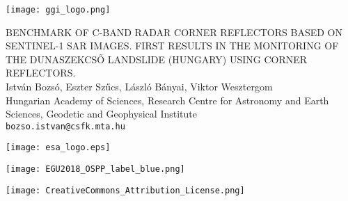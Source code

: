 \documentclass[a0, 18pt, landscape]{a0poster}
\begin{document}

\bfseries

\begin{mdframed}[linecolor=black, linewidth=5pt, innerleftmargin=10pt, innerrightmargin=10pt, innertopmargin=25pt, innerbottommargin=25pt, backgroundcolor=red!12.5!white, roundcorner=10pt]
    \hspace{25pt}
    \begin{minipage}[c]{0.1\textwidth}
        \texttt{[image: ggi\_logo.png]}
    \end{minipage}
    \hspace{-50pt}
    \begin{minipage}[c]{0.7\textwidth}
      \centering \LARGE {\color{blue!40!black} BENCHMARK OF C-BAND RADAR CORNER REFLECTORS BASED ON SENTINEL-1 SAR IMAGES. FIRST RESULTS IN THE MONITORING OF THE DUNASZEKCSŐ LANDSLIDE (HUNGARY) USING CORNER REFLECTORS.}\\[25pt] %
      István Bozsó, Eszter Szűcs, László Bányai, Viktor Wesztergom \\[10pt]%
     \large \normalfont Hungarian Academy of Sciences, Research Centre for Astronomy and Earth Sciences, Geodetic and Geophysical Institute\\[10pt]
    \Large \texttt{bozso.istvan@csfk.mta.hu}
    \end{minipage}
    \hspace{50pt}
    \begin{minipage}[c]{0.1\textwidth}
        \texttt{[image: esa\_logo.eps]}
    \end{minipage}
    \begin{minipage}[c]{0.1\textwidth}
        \texttt{[image: EGU2018\_OSPP\_label\_blue.png]}
        
        \vspace{10pt}
        \texttt{[image: CreativeCommons\_Attribution\_License.png]}
    \end{minipage}
\end{mdframed}


\small
\end{document}
